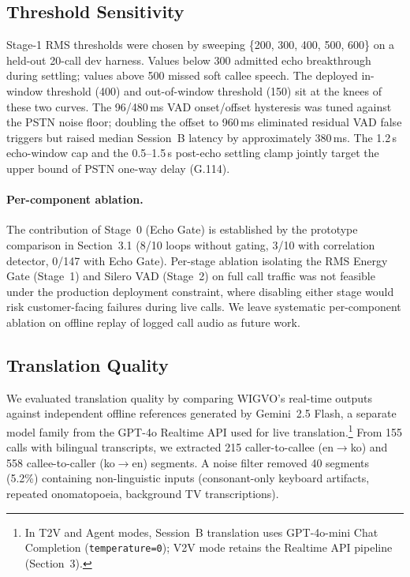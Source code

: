 \documentclass[11pt]{article}
\begin{document}
\subsection{Threshold Sensitivity}

Stage-1 RMS thresholds were chosen by sweeping
\{200, 300, 400, 500, 600\} on a held-out 20-call dev harness.
Values below 300 admitted echo breakthrough during settling;
values above 500 missed soft callee speech. The deployed
in-window threshold (400) and out-of-window threshold (150)
sit at the knees of these two curves. The 96/480\,ms VAD
onset/offset hysteresis was tuned against the PSTN noise floor;
doubling the offset to 960\,ms eliminated residual VAD false
triggers but raised median Session~B latency by approximately
380\,ms. The 1.2\,s echo-window cap and the 0.5--1.5\,s
post-echo settling clamp jointly target the upper bound of
PSTN one-way delay (G.114).

\paragraph{Per-component ablation.}
The contribution of Stage~0 (Echo Gate) is established by the
prototype comparison in Section~3.1 (8/10 loops without gating,
3/10 with correlation detector, 0/147 with Echo Gate). Per-stage
ablation isolating the RMS Energy Gate (Stage~1) and Silero VAD
(Stage~2) on full call traffic was not feasible under the
production deployment constraint, where disabling either stage
would risk customer-facing failures during live calls. We leave
systematic per-component ablation on offline replay of logged
call audio as future work.

\subsection{Translation Quality}

We evaluated translation quality by comparing WIGVO's real-time outputs against independent offline references generated by Gemini~2.5 Flash, a separate model family from the GPT-4o Realtime API used for live translation.\footnote{In T2V and Agent modes, Session~B translation uses GPT-4o-mini Chat Completion (\texttt{temperature=0}); V2V mode retains the Realtime API pipeline (Section~3).} From 155 calls with bilingual transcripts, we extracted 215 caller-to-callee (en$\to$ko) and 558 callee-to-caller (ko$\to$en) segments. A noise filter removed 40 segments (5.2\%) containing non-linguistic inputs (consonant-only keyboard artifacts, repeated onomatopoeia, background TV transcriptions).
\end{document}
